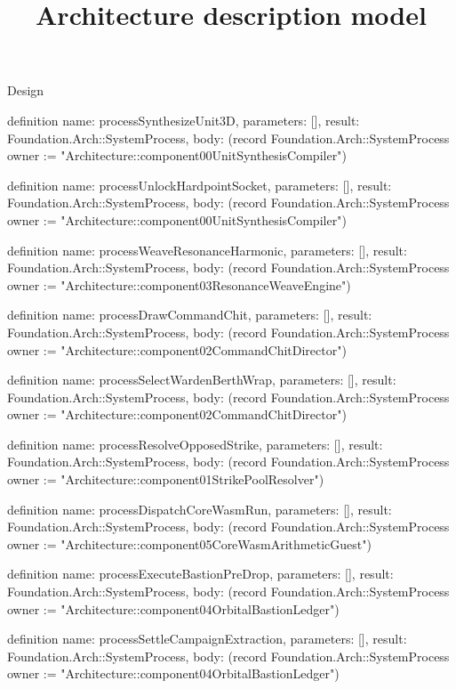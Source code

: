 \begin{lexlean}{Design}
\title{Architecture description model}
\begin{semanticmodule}
definition{
  name: processSynthesizeUnit3D,
  parameters: [],
  result: Foundation.Arch::SystemProcess,
  body: (record Foundation.Arch::SystemProcess {owner := "Architecture::component00UnitSynthesisCompiler"})
}

definition{
  name: processUnlockHardpointSocket,
  parameters: [],
  result: Foundation.Arch::SystemProcess,
  body: (record Foundation.Arch::SystemProcess {owner := "Architecture::component00UnitSynthesisCompiler"})
}

definition{
  name: processWeaveResonanceHarmonic,
  parameters: [],
  result: Foundation.Arch::SystemProcess,
  body: (record Foundation.Arch::SystemProcess {owner := "Architecture::component03ResonanceWeaveEngine"})
}

definition{
  name: processDrawCommandChit,
  parameters: [],
  result: Foundation.Arch::SystemProcess,
  body: (record Foundation.Arch::SystemProcess {owner := "Architecture::component02CommandChitDirector"})
}

definition{
  name: processSelectWardenBerthWrap,
  parameters: [],
  result: Foundation.Arch::SystemProcess,
  body: (record Foundation.Arch::SystemProcess {owner := "Architecture::component02CommandChitDirector"})
}

definition{
  name: processResolveOpposedStrike,
  parameters: [],
  result: Foundation.Arch::SystemProcess,
  body: (record Foundation.Arch::SystemProcess {owner := "Architecture::component01StrikePoolResolver"})
}

definition{
  name: processDispatchCoreWasmRun,
  parameters: [],
  result: Foundation.Arch::SystemProcess,
  body: (record Foundation.Arch::SystemProcess {owner := "Architecture::component05CoreWasmArithmeticGuest"})
}

definition{
  name: processExecuteBastionPreDrop,
  parameters: [],
  result: Foundation.Arch::SystemProcess,
  body: (record Foundation.Arch::SystemProcess {owner := "Architecture::component04OrbitalBastionLedger"})
}

definition{
  name: processSettleCampaignExtraction,
  parameters: [],
  result: Foundation.Arch::SystemProcess,
  body: (record Foundation.Arch::SystemProcess {owner := "Architecture::component04OrbitalBastionLedger"})
}


\end{semanticmodule}
\end{lexlean}
